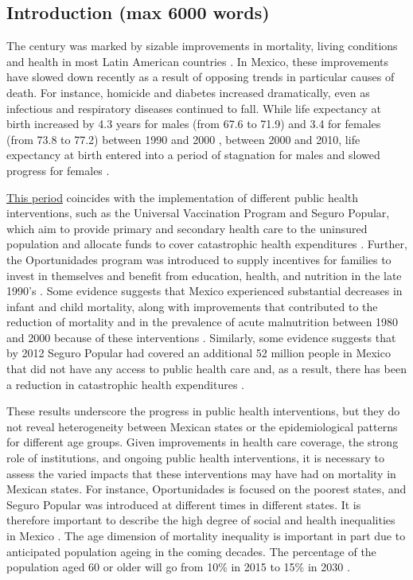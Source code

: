 \documentclass{article}
\newcommand{\un}[1]{\underline{#1}}
\begin{document}
\begin{spacing}{1.5}
\section*{Introduction (max 6000 words)}
The  century was marked by sizable improvements in mortality, living
conditions and health in most Latin American countries \citep{who2000}. 
In Mexico, these improvements have slowed down recently as a result of opposing
trends in particular causes of death. For instance, homicide and diabetes
increased dramatically, even as infectious and
respiratory diseases continued to fall. While life
expectancy at birth increased by 4.3 years for males (from 67.6 to 71.9) and 3.4
for females (from 73.8 to 77.2) between 1990 and 2000 \citep{SOMEDE},
between 2000 and 2010, life expectancy at birth entered into a period of
stagnation for males and slowed progress for females \citep{canudas2014}. 

\un{This
period} coincides with the implementation of different public health
interventions, such as the Universal Vaccination Program and Seguro
Popular, which aim to provide primary and secondary
health care to the uninsured population and allocate funds to cover catastrophic
health expenditures \citep{knaul2005}. Further, the Oportunidades program
was introduced to supply incentives for families to invest in themselves and
benefit from education, health, and nutrition in the late 1990's \citep{neufeld2012}. Some evidence
suggests that Mexico experienced substantial decreases in infant and child
mortality, along with improvements that contributed to the reduction of
mortality and in the prevalence of acute malnutrition between 1980 and 2000
because of these interventions \citep{sepulveda2006}. Similarly, some evidence
suggests that by 2012 Seguro Popular had covered an additional 52 million
people in Mexico that did not have any access to public health care and, as a result, there has been a reduction in catastrophic health expenditures \citep{knaul2012}.

 These results underscore the progress in public health interventions, but they
 do not reveal heterogeneity between Mexican states or the epidemiological patterns
 for different age groups. Given improvements in health care coverage, the strong role of institutions,
 and ongoing public health interventions, it is necessary to assess the varied
 impacts that these interventions may have had on mortality in Mexican
 states. For instance, Oportunidades is focused on the poorest
 states, and Seguro Popular was introduced at different times in different
 states. It is therefore important to describe the high degree of social and
 health inequalities in Mexico \citep{Frenk2006}. The age dimension of
 mortality inequality is important in part due to anticipated population ageing
 in the coming decades. The percentage of the population aged 60 or older will go from 10\% in 2015 to 15\% in 2030 \citep{CONAPO}.
 

\end{spacing}
\end{document}
